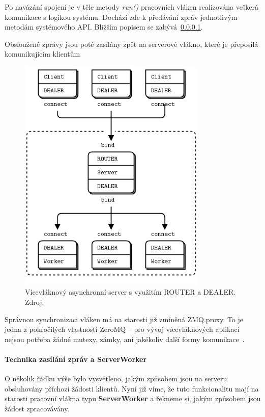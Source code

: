 \documentclass[thesis=M,czech]{FITthesis}[2014/05/07]
\begin{document}
Po navázání spojení je v těle metody \emph{run()} pracovních vláken realizována veškerá komunikace s logikou systému. Dochází zde k předávání zpráv jednotlivým metodám systémového API. Bližším popisem se zabývá~\ref{serverworker}. 

Obsloužené zprávy jsou poté zasílány zpět na serverové vlákno, které je přeposílá komunikujícím klientům

\begin{figure}\centering
	\includegraphics[width=0.8\textwidth]{obr/multithreadingServer.png}
 	\caption[Vícevláknový asynchronní server s využitím ROUTER a DEALER.]{Vícevláknový asynchronní server s využitím ROUTER a DEALER. Zdroj: \cite{mtserver}}\label{fig:mtserver}
\end{figure}	

Správnou synchronizaci vláken má na starosti již zmíněná ZMQ.proxy. To je jedna z pokročilých vlastností ZeroMQ – pro vývoj vícevláknových aplikací nejsou potřeba žádné mutexy, zámky, ani jakékoliv další formy komunikace~\cite{mtserver}.

\paragraph{Technika zasílání zpráv a ServerWorker}
\label{serverworker}
O několik řádku výše bylo vysvětleno, jakým způsobem jsou na serveru obsluhovány příchozí žádosti klientů. Nyní již víme, že tuto funkcionalitu mají na starosti pracovní vlákna typu \textbf{ServerWorker} a řekneme si, jakým způsobem jsou žádost zpracovávány.
\end{document}

